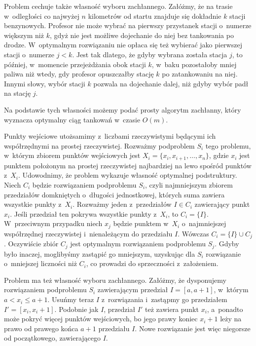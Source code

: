 Problem cechuje także własność wyboru zachłannego.
Załóżmy, że na trasie w~odległości co najwyżej $n$ kilometrów od startu znajduje się dokładnie $k$ stacji benzynowych.
Profesor nie może wybrać na pierwszy przystanek stacji o~numerze większym niż $k$, gdyż nie jest możliwe dojechanie do niej bez tankowania po drodze.
W~optymalnym rozwiązaniu nie opłaca się też wybierać jako pierwszej stacji o~numerze $j<k$.
Jest tak dlatego, że gdyby wybrana została stacja $j$, to później, w~momencie przejeżdżania obok stacji $k$, w~baku pozostałoby mniej paliwa niż wtedy, gdy profesor opuszczałby stację $k$ po zatankowaniu na niej.
Innymi słowy, wybór stacji $k$ pozwala na dojechanie dalej, niż gdyby wybór padł na stację $j$.

Na podstawie tych własności możemy podać prosty algorytm zachłanny, który wyznacza optymalny ciąg tankowań w~czasie $O(m)$.

\exercise %

\noindent Punkty wejściowe utożsamimy z~liczbami rzeczywistymi będącymi ich współrzędnymi na prostej rzeczywistej.
Rozważmy podproblem $S_i$ tego problemu, w~którym zbiorem punktów wejściowych jest $X_i=\{x_i,x_{i+1},\dots,x_n\}$, gdzie $x_i$ jest punktem położonym na prostej rzeczywistej najbardziej na lewo spośród punktów z~$X_i$.
Udowodnimy, że problem wykazuje własność optymalnej podstruktury.
Niech $C_i$ będzie rozwiązaniem podproblemu $S_i$, czyli najmniejszym zbiorem przedziałów domkniętych o~długości jednostkowej, których suma zawiera wszystkie punkty z~$X_i$.
Rozważmy jeden z~przedziałów $I\in C_i$ zawierający punkt $x_i$.
Jeśli przedział ten pokrywa wszystkie punkty z~$X_i$, to $C_i=\{I\}$.
W~przeciwnym przypadku niech $x_j$ będzie punktem w~$X_i$ o~najmniejszej współrzędnej rzeczywistej i~nienależącym do przedziału $I$.
Wówczas $C_i=\{I\}\cup C_j$.
Oczywiście zbiór $C_j$ jest optymalnym rozwiązaniem podproblemu $S_j$.
Gdyby było inaczej, moglibyśmy zastąpić go mniejszym, uzyskując dla $S_i$ rozwiązanie o~mniejszej liczności niż $C_i$, co prowadzi do sprzeczności z~założeniem.

Problem ma też własność wyboru zachłannego.
Załóżmy, że dysponujemy rozwiązaniem podproblemu $S_i$ zawierającym przedział $I=[a,a+1]$, w~którym $a<x_i\le a+1$.
Usuńmy teraz $I$ z~rozwiązania i~zastąpmy go przedziałem $I'=[x_i,x_i+1]$.
Podobnie jak $I$, przedział $I'$ też zawiera punkt $x_i$, a~ponadto może pokryć więcej punktów wejściowych, bo jego prawy koniec $x_i+1$ leży na prawo od prawego końca $a+1$ przedziału $I$.
Nowe rozwiązanie jest więc niegorsze od początkowego, zawierającego $I$.

